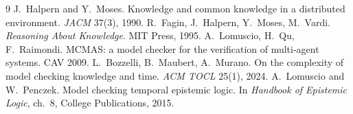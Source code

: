 \documentclass[10pt]{article}
\begin{document}
\begin{thebibliography}{9}\footnotesize
{} J.~Halpern and Y.~Moses. Knowledge and common knowledge in a distributed environment. \emph{JACM} 37(3), 1990.
 R.~Fagin, J.~Halpern, Y.~Moses, M.~Vardi. \emph{Reasoning About Knowledge}. MIT Press, 1995.
 A.~Lomuscio, H.~Qu, F.~Raimondi. MCMAS: a model checker for the verification of multi-agent systems. CAV 2009.
 L.~Bozzelli, B.~Maubert, A.~Murano. On the complexity of model checking knowledge and time. \emph{ACM TOCL} 25(1), 2024.
 A.~Lomuscio and W.~Penczek. Model checking temporal epistemic logic. In \emph{Handbook of Epistemic Logic}, ch.~8, College Publications, 2015.
\end{thebibliography}
\end{document}
